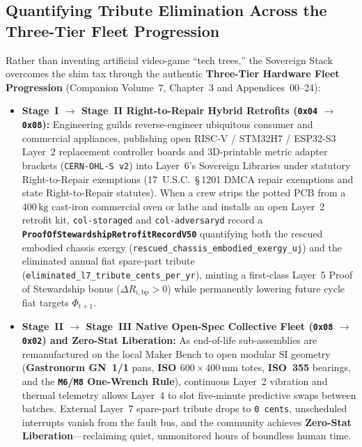 \subsection{Quantifying Tribute Elimination Across the Three-Tier Fleet Progression}

Rather than inventing artificial video-game ``tech trees,'' the Sovereign Stack overcomes the shim tax through the authentic \textbf{Three-Tier Hardware Fleet Progression} (Companion Volume~7, Chapter~3 and Appendices~00--24):
\begin{itemize}
  \item \textbf{Stage~I $\to$ Stage~II Right-to-Repair Hybrid Retrofits (\texttt{0x04} $\to$ \texttt{0x08}):} Engineering guilds reverse-engineer ubiquitous consumer and commercial appliances, publishing open RISC-V / STM32H7 / ESP32-S3 Layer~2 replacement controller boards and 3D-printable metric adapter brackets (\texttt{CERN-OHL-S v2}) into Layer~6's Sovereign Libraries under statutory Right-to-Repair exemptions (17~U.S.C.~\S\,1201 DMCA repair exemptions and state Right-to-Repair statutes). When a crew strips the potted PCB from a $400\,\mathrm{kg}$ cast-iron commercial oven or lathe and installs an open Layer~2 retrofit kit, \texttt{col-storaged} and \texttt{col-adversaryd} record a \textbf{\texttt{ProofOfStewardshipRetrofitRecordV50}} quantifying both the rescued embodied chassis exergy (\texttt{rescued\_chassis\_embodied\_exergy\_uj}) and the eliminated annual fiat spare-part tribute (\texttt{eliminated\_l7\_tribute\_cents\_per\_yr}), minting a first-class Layer~5 Proof of Stewardship bonus ($\Delta R_{i,\mathrm{bp}} > 0$) while permanently lowering future cycle fiat targets $\Phi_{t+1}$.
  \item \textbf{Stage~II $\to$ Stage~III Native Open-Spec Collective Fleet (\texttt{0x08} $\to$ \texttt{0x02}) and Zero-Stat Liberation:} As end-of-life sub-assemblies are remanufactured on the local Maker Bench to open modular SI geometry (\textbf{Gastronorm GN~1/1} pans, \textbf{ISO $600 \times 400\,\mathrm{mm}$} totes, \textbf{ISO~355} bearings, and the \textbf{\texttt{M6}/\texttt{M8} One-Wrench Rule}), continuous Layer~2 vibration and thermal telemetry allows Layer~4 to slot five-minute predictive swaps between batches. External Layer~7 spare-part tribute drops to \texttt{0 cents}, unscheduled interrupts vanish from the fault bus, and the community achieves \textbf{Zero-Stat Liberation}---reclaiming quiet, unmonitored hours of boundless human time.
\end{itemize}

